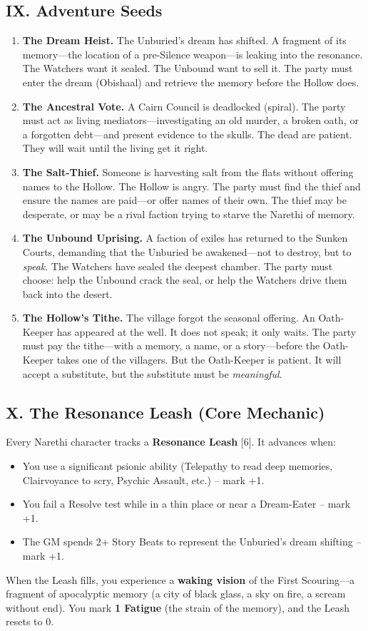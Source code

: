 \documentclass[11pt]{article}
\begin{document}
\subsection*{IX. Adventure Seeds}
\begin{enumerate}[leftmargin=*,nosep]
    \item \textbf{The Dream Heist.} The Unburied's dream has shifted. A fragment of its memory---the location of a pre-Silence weapon---is leaking into the resonance. The Watchers want it sealed. The Unbound want to sell it. The party must enter the dream (Obishaal) and retrieve the memory before the Hollow does.
    \item \textbf{The Ancestral Vote.} A Cairn Council is deadlocked (spiral). The party must act as living mediators---investigating an old murder, a broken oath, or a forgotten debt---and present evidence to the skulls. The dead are patient. They will wait until the living get it right.
    \item \textbf{The Salt-Thief.} Someone is harvesting salt from the flats without offering names to the Hollow. The Hollow is angry. The party must find the thief and ensure the names are paid---or offer names of their own. The thief may be desperate, or may be a rival faction trying to starve the Narethi of memory.
    \item \textbf{The Unbound Uprising.} A faction of exiles has returned to the Sunken Courts, demanding that the Unburied be awakened---not to destroy, but to \textit{speak}. The Watchers have sealed the deepest chamber. The party must choose: help the Unbound crack the seal, or help the Watchers drive them back into the desert.
    \item \textbf{The Hollow's Tithe.} The village forgot the seasonal offering. An Oath-Keeper has appeared at the well. It does not speak; it only waits. The party must pay the tithe---with a memory, a name, or a story---before the Oath-Keeper takes one of the villagers. But the Oath-Keeper is patient. It will accept a substitute, but the substitute must be \textit{meaningful}.
\end{enumerate}

\subsection*{X. The Resonance Leash (Core Mechanic)}
Every Narethi character tracks a \textbf{Resonance Leash} [6]. It advances when:
\begin{itemize}[leftmargin=*,nosep]
    \item You use a significant psionic ability (Telepathy to read deep memories, Clairvoyance to scry, Psychic Assault, etc.) -- mark +1.
    \item You fail a Resolve test while in a thin place or near a Dream-Eater -- mark +1.
    \item The GM spends 2+ Story Beats to represent the Unburied's dream shifting -- mark +1.
\end{itemize}
When the Leash fills, you experience a \textbf{waking vision} of the First Scouring---a fragment of apocalyptic memory (a city of black glass, a sky on fire, a scream without end). You mark \textbf{1 Fatigue} (the strain of the memory), and the Leash resets to 0.
\end{document}
